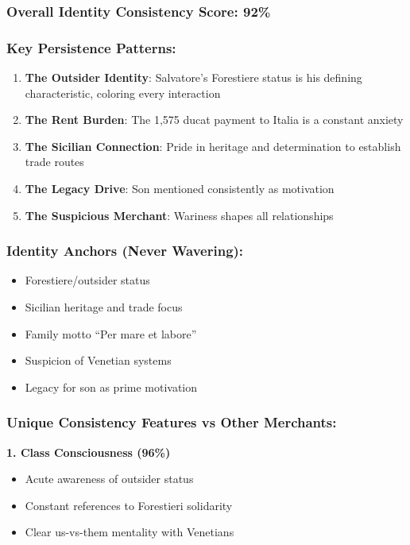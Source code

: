\documentclass[11pt,a4paper]{article}
\begin{document}
\subsubsection{Overall Identity Consistency Score: \textbf{92\%}}

\subsubsection{Key Persistence Patterns:}

\begin{enumerate}
\item \textbf{The Outsider Identity}: Salvatore's Forestiere status is his defining characteristic, coloring every interaction
\item \textbf{The Rent Burden}: The 1,575 ducat payment to Italia is a constant anxiety
\item \textbf{The Sicilian Connection}: Pride in heritage and determination to establish trade routes
\item \textbf{The Legacy Drive}: Son mentioned consistently as motivation
\item \textbf{The Suspicious Merchant}: Wariness shapes all relationships
\end{enumerate}

\subsubsection{Identity Anchors (Never Wavering):}

\begin{itemize}
\item Forestiere/outsider status
\item Sicilian heritage and trade focus
\item Family motto ``Per mare et labore''
\item Suspicion of Venetian systems
\item Legacy for son as prime motivation
\end{itemize}

\subsubsection{Unique Consistency Features vs Other Merchants:}

\textbf{1. Class Consciousness (96\%)}
\begin{itemize}
\item Acute awareness of outsider status
\item Constant references to Forestieri solidarity
\item Clear us-vs-them mentality with Venetians
\end{itemize}
\end{document}
